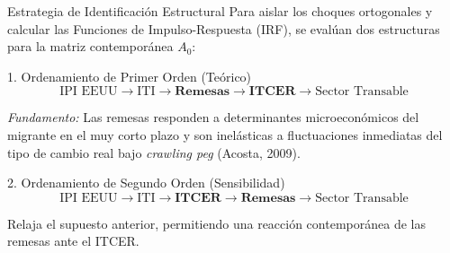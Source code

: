 \documentclass[
  10pt,
  ignorenonframetext,
  aspectratio=169,
  spanish,
]{beamer}
\begin{document}
\begin{frame}{Estrategia de Identificación Estructural}
\protect{}\label{estrategia-de-identificaciuxf3n-estructural}
Para aislar los choques ortogonales y calcular las Funciones de
Impulso-Respuesta (IRF), se evalúan dos estructuras para la matriz
contemporánea \(A_0\):

\vspace{0.3cm}

\begin{block}{1. Ordenamiento de Primer Orden (Teórico)}
\protect{}\label{ordenamiento-de-primer-orden-teuxf3rico}
\[\text{IPI EEUU} \rightarrow \text{ITI} \rightarrow \mathbf{Remesas} \rightarrow \mathbf{ITCER} \rightarrow \text{Sector Transable}\]

\emph{Fundamento:} Las remesas responden a determinantes microeconómicos
del migrante en el muy corto plazo y son inelásticas a fluctuaciones
inmediatas del tipo de cambio real bajo \emph{crawling peg} (Acosta,
2009).
\end{block}

\begin{block}{2. Ordenamiento de Segundo Orden (Sensibilidad)}
\protect{}\label{ordenamiento-de-segundo-orden-sensibilidad}
\[\text{IPI EEUU} \rightarrow \text{ITI} \rightarrow \mathbf{ITCER} \rightarrow \mathbf{Remesas} \rightarrow \text{Sector Transable}\]

Relaja el supuesto anterior, permitiendo una reacción contemporánea de
las remesas ante el ITCER.
\end{block}
\end{frame}
\end{document}
